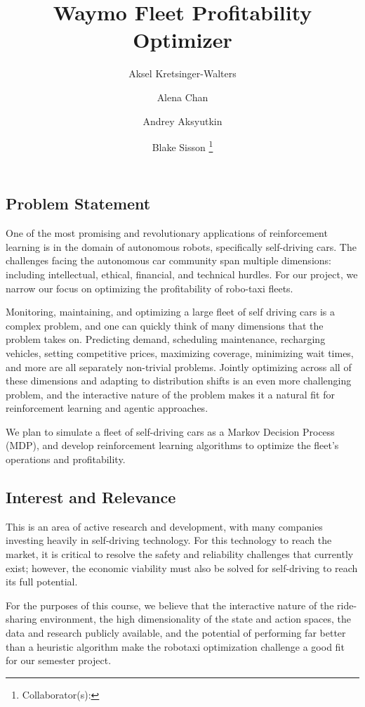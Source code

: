 \documentclass[12pt]{article}
\title{Waymo Fleet Profitability Optimizer}
\author{
		Aksel Kretsinger-Walters \and
		Alena Chan \and
		Andrey Aksyutkin \and
		Blake Sisson \footnote{Collaborator(s): \collaborators}
}
\date{}
\begin{document}
\maketitle

\subsection*{Problem Statement}
One of the most promising and revolutionary applications of reinforcement learning is in
the domain of autonomous robots, specifically self-driving cars. The challenges facing the
autonomous car community span multiple dimensions: including intellectual, ethical, financial,
and technical hurdles. For our project, we narrow our focus on optimizing the profitability
of robo-taxi fleets.

Monitoring, maintaining, and optimizing a large fleet of self driving cars is a complex
problem, and one can quickly think of many dimensions that the problem takes on.
Predicting demand, scheduling maintenance, recharging vehicles, setting competitive
prices, maximizing coverage, minimizing wait times, and more are all separately non-trivial
problems. Jointly optimizing across all of these dimensions and adapting to distribution shifts
is an even more challenging problem, and the interactive nature of the problem makes it a natural
fit for reinforcement learning and agentic approaches.

We plan to simulate a fleet of self-driving cars as a Markov Decision Process (MDP), and
develop reinforcement learning algorithms to optimize the fleet's operations and profitability.

\subsection*{Interest and Relevance}
This is an area of active research and development, with many companies investing heavily in
self-driving technology. For this technology to reach the market, it is critical to resolve the
safety and reliability challenges that currently exist; however, the economic viability must
also be solved for self-driving to reach its full potential.

For the purposes of this course, we believe that the interactive nature of the
ride-sharing environment,
the high dimensionality of the state and action spaces, the data and research publicly
available, and the potential of performing far better than a heuristic algorithm make the
robotaxi optimization challenge a good fit for our semester project.
\end{document}
